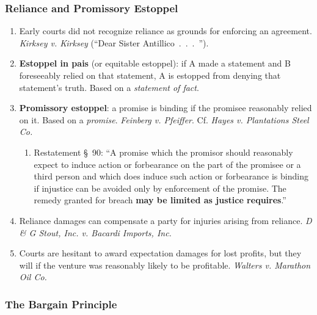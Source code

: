 \subsubsection{Reliance and Promissory Estoppel}

\begin{enumerate}
    \item Early courts did not recognize reliance as grounds for enforcing an 
    agreement. \emph{Kirksey v. Kirksey} (``Dear Sister Antillico~.~.~.~'').
    \item \textbf{Estoppel in pais} (or equitable estoppel): if A made a 
    statement and B foreseeably relied on that statement, A is estopped from 
    denying that statement's truth. Based on a \emph{statement of fact}.
    \item \textbf{Promissory estoppel}: a promise is binding if the promisee 
    reasonably relied on it. Based on a \emph{promise}. \emph{Feinberg v. 
    Pfeiffer}. Cf. \emph{Hayes v. Plantations Steel Co.}
    \begin{enumerate}
        \item Restatement \S\ 90: ``A promise which the promisor should 
        reasonably expect to induce action or forbearance on the part of the 
        promisee or a third person and which does induce such action or 
        forbearance is binding if injustice can be avoided only by enforcement 
        of the promise. The remedy granted for breach \textbf{may be limited 
        as justice requires}.''
    \end{enumerate}
    \item Reliance damages can compensate a party for injuries arising from 
    reliance. \emph{D \& G Stout, Inc. v. Bacardi Imports, Inc.}
    \item Courts are hesitant to award expectation damages for lost profits, 
    but they will if the venture was reasonably likely to be profitable. 
    \emph{Walters v. Marathon Oil Co.}
\end{enumerate}

\subsubsection{The Bargain Principle}

